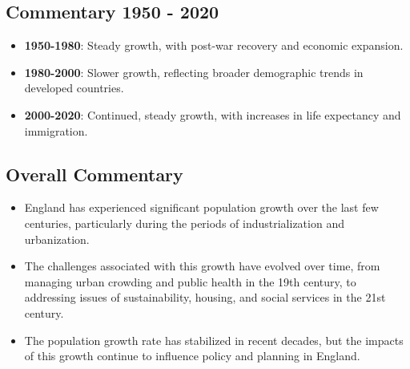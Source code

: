 \subsection*{Commentary 1950 - 2020}
\begin{itemize}
    \item \textbf{1950-1980}: Steady growth, with post-war recovery and economic expansion.
    \item \textbf{1980-2000}: Slower growth, reflecting broader demographic trends in developed countries.
    \item \textbf{2000-2020}: Continued, steady growth, with increases in life expectancy and immigration.
\end{itemize}

\subsection*{Overall Commentary}
\begin{itemize}
    \item England has experienced significant population growth over the last few centuries, particularly during the periods of industrialization and urbanization.
    \item The challenges associated with this growth have evolved over time, from managing urban crowding and public health in the 19th century, to addressing issues of sustainability, housing, and social services in the 21st century.
    \item The population growth rate has stabilized in recent decades, but the impacts of this growth continue to influence policy and planning in England.
\end{itemize}
